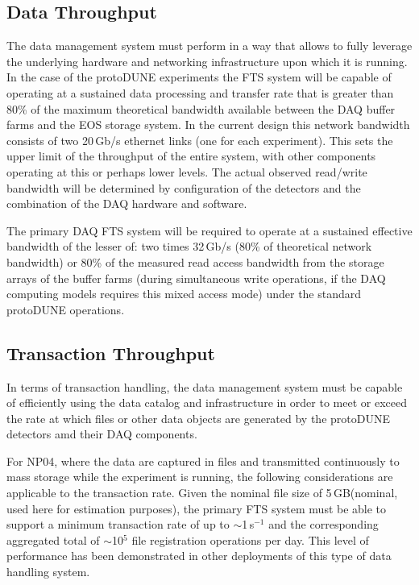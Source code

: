 \documentclass[12pt]{article}
\newcommand{\pd}{protoDUNE\xspace}
\newcommand{\filesize}{5\,GB\xspace}
\begin{document}
\subsection{Data Throughput}

The data management system must perform in a way that allows to fully leverage the underlying hardware and networking infrastructure
upon which  it is running.  In the case of the \pd experiments the FTS system will be capable of operating at a sustained data processing and transfer
rate that is greater than 80\% of the maximum theoretical bandwidth available between the DAQ buffer farms and the EOS storage system.
In the current design this network bandwidth consists of two 20\,Gb/s ethernet links (one for each experiment).
This sets the upper limit of the throughput of the entire system, with other components operating at this or perhaps lower levels.
The actual observed read/write bandwidth will be determined by configuration of the detectors and the combination
of the DAQ hardware and software.


  The primary DAQ FTS system will be required to operate at a sustained effective bandwidth
of the lesser of: two times 32\,Gb/s (80\% of theoretical network bandwidth) or 80\% of the measured read access bandwidth from the storage arrays
of the buffer farms
(during simultaneous write operations, if the DAQ computing models requires this mixed access mode) under the standard \pd operations.

\subsection{Transaction Throughput}

In terms of transaction handling,  the data management system must be capable of efficiently using the data
catalog and infrastructure in order to meet or exceed the rate at which files or other data
objects are generated by the \pd detectors amd their DAQ components.

For NP04, where the data are captured in files and transmitted continuously to mass storage while
the experiment is running, the following considerations are applicable to the transaction rate.
Given the nominal file size of \filesize (nominal, used here for estimation purposes), 
the primary FTS system must be able to support a minimum transaction rate of up to  $\sim$1\,s$^{-1}$
and the corresponding aggregated total of $\sim$10$^5$ file registration operations per day.
This level of performance has been demonstrated in other deployments of this type of data
handling system.
\end{document}
